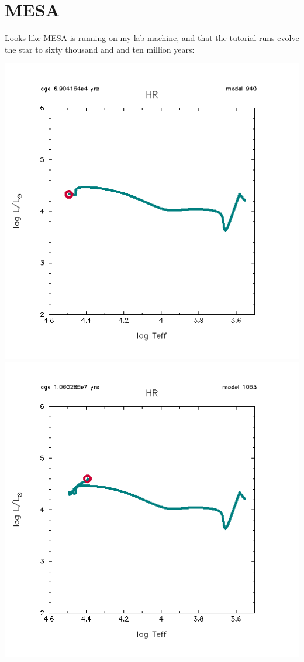\documentclass[12pt]{article}
\begin{document}
\section{MESA}

Looks like MESA is running on my lab machine, and that the tutorial runs evolve the star to sixty thousand and and ten million years:

\begin{center}
\includegraphics[scale=.7]{HR_pre.png}
\includegraphics[scale=.7]{HR_post.png}

\end{center}
\end{document}
